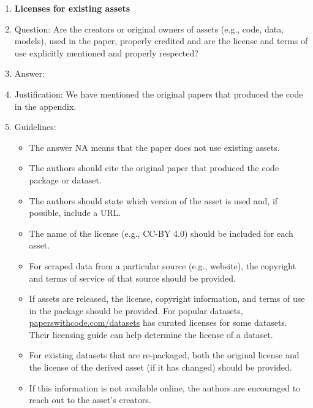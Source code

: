 \documentclass{article}
\theoremstyle{remark}
\begin{document}
\begin{enumerate}
\item {\bf Licenses for existing assets}
    \item[] Question: Are the creators or original owners of assets (e.g., code, data, models), used in the paper, properly credited and are the license and terms of use explicitly mentioned and properly respected?
    \item[] Answer: \answerYes{} %
    \item[] Justification: We have mentioned the original papers that produced the code in the appendix.
    \item[] Guidelines:
    \begin{itemize}
        \item The answer NA means that the paper does not use existing assets.
        \item The authors should cite the original paper that produced the code package or dataset.
        \item The authors should state which version of the asset is used and, if possible, include a URL.
        \item The name of the license (e.g., CC-BY 4.0) should be included for each asset.
        \item For scraped data from a particular source (e.g., website), the copyright and terms of service of that source should be provided.
        \item If assets are released, the license, copyright information, and terms of use in the package should be provided. For popular datasets, \url{paperswithcode.com/datasets} has curated licenses for some datasets. Their licensing guide can help determine the license of a dataset.
        \item For existing datasets that are re-packaged, both the original license and the license of the derived asset (if it has changed) should be provided.
        \item If this information is not available online, the authors are encouraged to reach out to the asset's creators.
    \end{itemize}


\end{enumerate}
\end{document}
